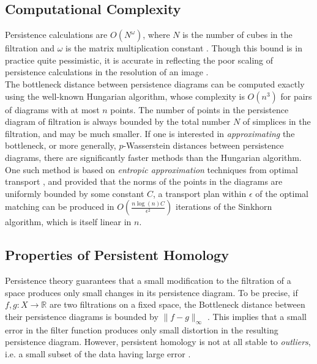 \documentclass[conference]{IEEEtran}
\theoremstyle{definition}
\numberwithin{figure}{section}
\begin{document}
\subsection{Computational Complexity}
Persistence calculations are $O(N^{\omega})$, where $N$ is the number of cubes in the filtration and $\omega$ is the matrix multiplication constant \cite{milosavljevic2011zigzag}. Though this bound is in practice quite pessimistic, it is accurate in reflecting the poor scaling of persistence calculations in the resolution of an image \cite{otter2017roadmap}.\\

The bottleneck distance between persistence diagrams can be computed exactly using the well-known Hungarian algorithm, whose complexity is $O(n^3)$ for pairs of diagrams with at most $n$ points. The number of points in the persistence diagram of filtration is always bounded by the total number $N$ of simplices in the filtration, and may be much smaller. If one is interested in \emph{approximating} the bottleneck, or more generally, $p$-Wasserstein distances between persistence diagrams, there are significantly faster methods than the Hungarian algorithm. One such method is based on \emph{entropic approximation} techniques from optimal transport \cite{lacombe2018large}, and provided that the norms of the points in the diagrams are uniformly bounded by some constant $C$, a transport plan within $\epsilon$ of the optimal matching can be produced in $O(\frac{n \log(n) C}{\epsilon^2})$ iterations of the Sinkhorn algorithm, which is itself linear in $n$. 


\subsection{Properties of Persistent Homology}
\label{subsec:persprop}
Persistence theory guarantees that a small modification to the filtration of a space produces only small changes in its persistence diagram. To be precise, if $f,g:X \to \mathbb{R}$ are two filtrations on a fixed space, the Bottleneck distance between their persistence diagrams is bounded by $\|f-g\|_{\infty}$  \cite{cohen2007stability}. This implies that a small error in the filter function produces only small distortion in the resulting persistence diagram. However, persistent homology is not at all stable to \emph{outliers}, i.e. a small subset of the data having large error \cite{buchet2014topological}.\\ 
\end{document}
